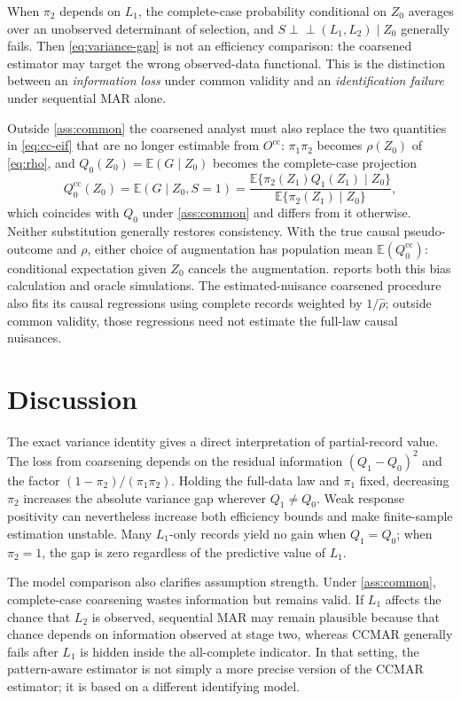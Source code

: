 \documentclass[11pt]{article}
\theoremstyle{definition}
\newcommand{\E}{\mathbb{E}}
\newcommand{\indep}{\perp\!\!\!\perp}
\newcommand{\1}{\mathbf{1}}
\newcommand{\cc}{\mathrm{cc}}
\begin{document}
When $\pi_2$ depends on $L_1$, the complete-case probability conditional on $Z_0$
averages over an unobserved determinant of selection, and $S\indep(L_1,L_2)\mid Z_0$
generally fails. Then \cref{eq:variance-gap} is not an efficiency comparison:
the coarsened estimator may target the wrong observed-data functional. This is
the distinction between an \emph{information loss} under common validity and an
\emph{identification failure} under sequential MAR alone.

Outside \cref{ass:common} the coarsened analyst must also replace the two
quantities in \cref{eq:cc-eif} that are no longer estimable from $O^{\cc}$:
$\pi_1\pi_2$ becomes $\rho(Z_0)$ of \cref{eq:rho}, and $Q_0(Z_0)=\E(G\mid Z_0)$
becomes the complete-case projection
\[
Q_0^{\cc}(Z_0)=\E(G\mid Z_0,S=1)
=\frac{\E\{\pi_2(Z_1)Q_1(Z_1)\mid Z_0\}}{\E\{\pi_2(Z_1)\mid Z_0\}},
\]
which coincides with $Q_0$ under \cref{ass:common} and differs from it otherwise.
Neither substitution generally restores consistency. With the true causal pseudo-outcome and $\rho$, either choice of augmentation has population mean $\E(Q_0^{\cc})$: conditional expectation given $Z_0$ cancels the augmentation.  reports both this bias calculation and oracle simulations. The estimated-nuisance coarsened procedure also fits its causal regressions using complete records weighted by $1/\widehat\rho$; outside common validity, those regressions need not estimate the full-law causal nuisances.



\section{Discussion}

The exact variance identity gives a direct interpretation of partial-record value. The loss from coarsening depends on the residual information $(Q_1-Q_0)^2$ and the factor $(1-\pi_2)/(\pi_1\pi_2)$. Holding the full-data law and $\pi_1$ fixed, decreasing $\pi_2$ increases the absolute variance gap wherever $Q_1\ne Q_0$. Weak response positivity can nevertheless increase both efficiency bounds and make finite-sample estimation unstable. Many $L_1$-only records yield no gain when $Q_1=Q_0$; when $\pi_2=1$, the gap is zero regardless of the predictive value of $L_1$.

The model comparison also clarifies assumption strength. Under \cref{ass:common}, complete-case coarsening wastes information but remains valid. If $L_1$ affects the chance that $L_2$ is observed, sequential MAR may remain plausible because that chance depends on information observed at stage two, whereas CCMAR generally fails after $L_1$ is hidden inside the all-complete indicator. In that setting, the pattern-aware estimator is not simply a more precise version of the CCMAR estimator; it is based on a different identifying model.
\end{document}
